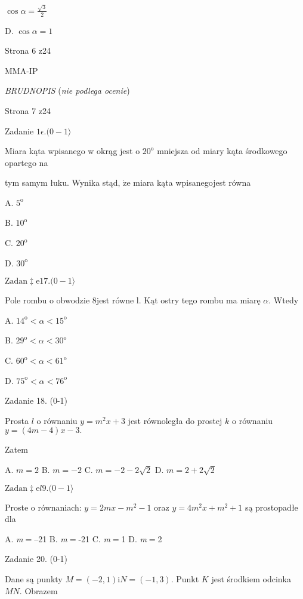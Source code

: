 \documentclass[a4paper,12pt]{article}
\begin{document}
$\displaystyle \cos\alpha=\frac{\sqrt{3}}{2}$

D. $\cos\alpha=1$

Strona 6 z24

MMA-IP





{\it BRUDNOPIS} ({\it nie podlega ocenie})

Strona 7 z24





Zadanie $1\epsilon. (0-1\rangle$

Miara kąta wpisanego w okrąg jest o $20^{\mathrm{o}}$ mniejsza od miary kąta środkowego opartego na

tym samym łuku. Wynika stąd, $\dot{\mathrm{z}}\mathrm{e}$ miara kąta wpisanegojest równa

A. $5^{\mathrm{o}}$

B. $10^{\mathrm{o}}$

C. $20^{\mathrm{o}}$

D. $30^{\mathrm{o}}$

$\mathrm{Z}\mathrm{a}\mathrm{d}\mathrm{a}\mathrm{n}\ddagger \mathrm{e}17. (0-1\rangle$

Pole rombu o obwodzie $8$jest równe l. Kąt ostry tego rombu ma miarę $\alpha$. Wtedy

A. $14^{\mathrm{o}}<\alpha<15^{\mathrm{o}}$

B. $29^{\mathrm{o}}<\alpha<30^{\mathrm{o}}$

C. $60^{\mathrm{o}}<\alpha<61^{\mathrm{o}}$

D. $75^{\mathrm{o}}<\alpha<76^{\mathrm{o}}$

Zadanie 18. (0-1)

Prosta $l$ o równaniu $y=m^{2}x+3$ jest równoległa do prostej $k$ o równaniu $y=(4m-4)x-3.$

Zatem

A. $m=2$ B. $m=-2$ C. $m=-2-2\sqrt{2}$ D. $m=2+2\sqrt{2}$

$\mathrm{Z}\mathrm{a}\mathrm{d}\mathrm{a}\mathrm{n}\ddagger \mathrm{e}l9. (0-1\rangle$

Proste o równaniach: $y=2mx-m^{2}-1$ oraz $y=4m^{2}x+m^{2}+1$ są prostopadłe dla

A. {\it m}$=$--21 B. {\it m}$=$-21 C. {\it m}$=$1 D. {\it m}$=$2

Zadanie 20. (0-1)

Dane są punkty $M=(-2,1) \mathrm{i} N=(-1,3)$. Punkt $K$ jest środkiem odcinka $MN$. Obrazem
\end{document}
